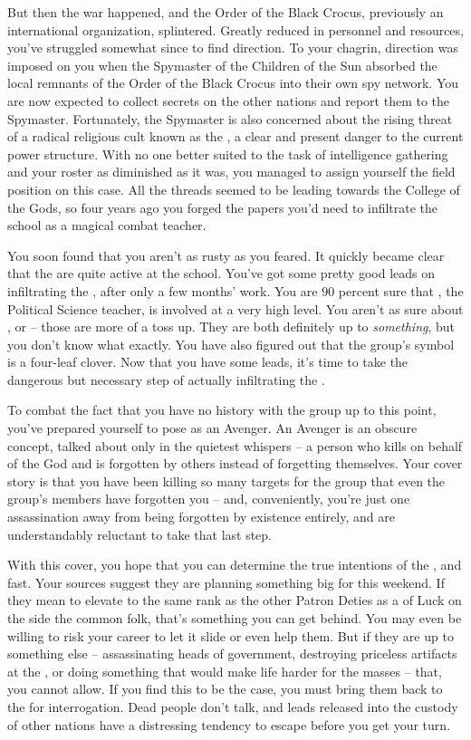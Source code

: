 \documentclass[char]{GL2020}
\begin{document}
But then the war happened, and the Order of the Black Crocus, previously an international organization, splintered. Greatly reduced in personnel and resources, you've struggled somewhat since to find direction. To your chagrin, direction was imposed on you when the Spymaster of the Children of the Sun absorbed the local remnants of the Order of the Black Crocus into their own spy network. You are now expected to collect secrets on the other nations and report them to the Spymaster. Fortunately, the Spymaster is also concerned about the rising threat of a radical religious cult known as the \pGoaties{}, a clear and present danger to the current power structure. With no one better suited to the task of intelligence gathering and your roster as diminished as it was, you managed to assign yourself the field position on this case. All the threads seemed to be leading towards the College of the Gods, so four years ago you forged the papers you'd need to infiltrate the school as a magical combat teacher.

You soon found that you aren't as rusty as you feared. It quickly became clear that the \pGoaties{} are quite active at the school. You've got some pretty good leads on infiltrating the \pGoaties{}, after only a few months' work. You are 90 percent sure that \cChupInventor{\full}, the Political Science teacher, is involved at a very high level. You aren't as sure about \cChupSecond{\full}, or \cWildCard{\full} -- those are more of a toss up. They are both definitely up to \emph{something}, but you don't know what exactly. You have also figured out that the group's symbol is a four-leaf clover. Now that you have some leads, it's time to take the dangerous but necessary step of actually infiltrating the \pGoaties{}.

To combat the fact that you have no history with the group up to this point, you've prepared yourself to pose as an Avenger. An Avenger is an obscure concept, talked about only in the quietest whispers -- a person who kills on behalf of the God \cGenesis{} and is forgotten by others instead of forgetting themselves. Your cover story is that you have been killing so many targets for the group that even the group's members have forgotten you -- and, conveniently, you're just one assassination away from being forgotten by existence entirely, and are understandably reluctant to take that last step.

With this cover, you hope that you can determine the true intentions of the \pGoaties{}, and fast. Your sources suggest they are planning something big for this weekend. If they mean to elevate \cGenesis{} to the same rank as the other Patron Deties as a \cGenesis{\Deity} of Luck on the side the common folk, that's something you can get behind. You may even be willing to risk your career to let it slide or even help them. But if they are up to something else -- assassinating heads of government, destroying priceless artifacts at the \pSchool{}, or doing something that would make life harder for the masses -- that, you cannot allow. If you find this to be the case, you must bring them back to the \pFarm{} for interrogation. Dead people don't talk, and leads released into the custody of other nations have a distressing tendency to escape before you get your turn.
\end{document}
